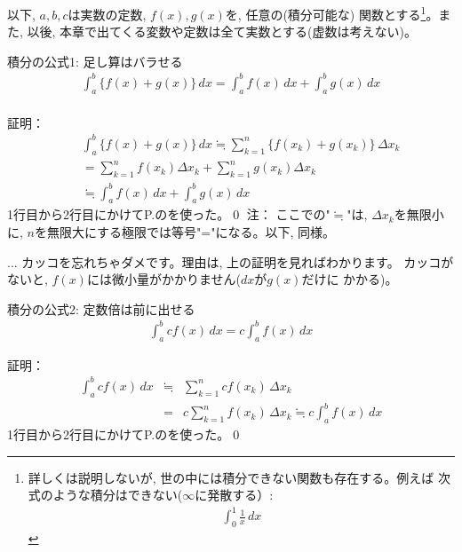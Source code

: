 以下, $a, b, c$は実数の定数, $f(x), g(x)$を, 任意の(積分可能な)
関数とする\footnote{詳しくは説明しないが, 世の中には積分できない関数も存在する。例えば
次式のような積分はできない($\infty$に発散する）: 
\begin{eqnarray*}\int_{0}^{1}\frac{1}{x}\,dx\end{eqnarray*}
}。また, 以後, 本章で出てくる変数や定数は全て実数とする(虚数は考えない)。
\mv

\begin{itembox}{積分の公式1: 足し算はバラせる}
\begin{eqnarray}
\int_{a}^{b}\{f(x)+g(x)\}\, dx=\int_{a}^{b}f(x)\, dx+\int_{a}^{b}g(x)\, dx\nonumber\\
\label{eq:int_baraseru}\end{eqnarray}
\end{itembox}
証明：
\begin{eqnarray*}
&&\int_{a}^{b}\{f(x)+g(x)\}\, dx \fallingdotseq \sum_{k=1}^n \{f(x_k)+g(x_k)\}\, \Delta x_k\\
&&=\sum_{k=1}^n f(x_k) \Delta x_k + \sum_{k=1}^n g(x_k) \Delta x_k\\
&&\fallingdotseq \int_{a}^{b}f(x)\, dx + \int_{a}^{b}g(x)\, dx
\end{eqnarray*}
1行目から2行目にかけてP.\pageref{eq:sum_linear1}のを使った。\qed
注： ここでの"$\fallingdotseq$"は, $\Delta x_k$を無限小
に, $n$を無限大にする極限では等号"="になる。以下, 同様。\hv

\begin{freqmiss}{\small{} ... カッコを忘れちゃダメです。理由は, 上の証明を見ればわかります。
カッコがないと, $f(x)$には微小量がかかりません($dx$が$g(x)$だけに
かかる)。}\end{freqmiss}

\begin{itembox}{積分の公式2: 定数倍は前に出せる}
\begin{eqnarray}
\int_{a}^{b}cf(x)\, dx=c\int_{a}^{b}f(x)\, dx
\end{eqnarray}
\end{itembox}
証明：
\begin{eqnarray*}
\int_{a}^{b}cf(x)\, dx &\fallingdotseq& \sum_{k=1}^n cf(x_k)\, \Delta x_k\\
&=&c\sum_{k=1}^n f(x_k)\,\Delta x_k \fallingdotseq c\int_{a}^{b}f(x)\, dx
\end{eqnarray*}
1行目から2行目にかけてP.\pageref{eq:sum_linear2}のを使った。\qed

